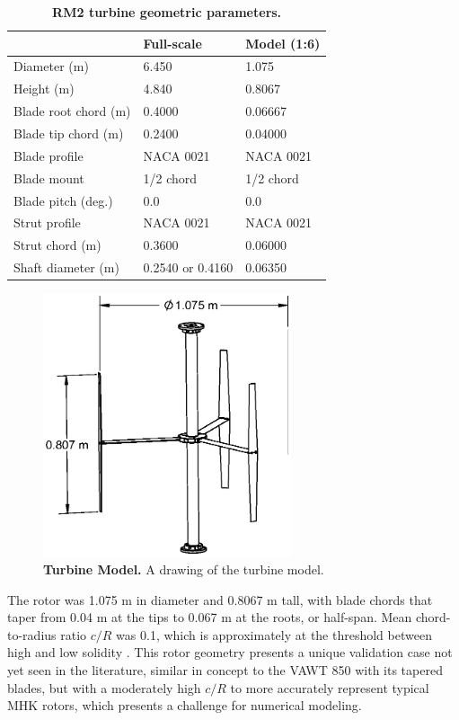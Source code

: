 \documentclass[10pt,letterpaper]{article}
\begin{document}
\begin{table}[ht]
\centering
\begin{tabular}{l|l|l}
   & Full-scale & Model (1:6) \\
\hline
Diameter (m)   & 6.450 & 1.075 \\
Height (m)     & 4.840 & 0.8067 \\
Blade root chord (m) & 0.4000 & 0.06667 \\
Blade tip chord (m)  & 0.2400 & 0.04000 \\
Blade profile & NACA 0021 & NACA 0021 \\
Blade mount & 1/2 chord & 1/2 chord \\
Blade pitch (deg.) & 0.0 & 0.0 \\
Strut profile & NACA 0021 & NACA 0021 \\
Strut chord (m) & 0.3600 & 0.06000 \\
Shaft diameter (m) & 0.2540 \cite{Beam2011} or 0.4160 \cite{Hill2014} & 0.06350\\
\end{tabular}
\caption{\textbf{RM2 turbine geometric parameters.}}
\label{tab:turb-geom}
\end{table}

\begin{figure}[h]
    \includegraphics[width=0.65\textwidth]{figures/turbine.eps}

    \caption{{\bf Turbine Model.} A drawing of the turbine model.}

    \label{fig:turbine-drawing}
\end{figure}

The rotor was 1.075 m in diameter and 0.8067 m tall, with blade chords that
taper from 0.04 m at the tips to 0.067 m at the roots, or half-span. Mean
chord-to-radius ratio $c/R$ was 0.1, which is approximately at the threshold
between high and low solidity \cite{Strickland1981,Fiedler2009}. This rotor
geometry presents a unique validation case not yet seen in the literature,
similar in concept to the VAWT 850 \cite{Mays1990} with its tapered blades, but
with a moderately high $c/R$ to more accurately represent typical MHK rotors,
which presents a challenge for numerical modeling.
\end{document}
